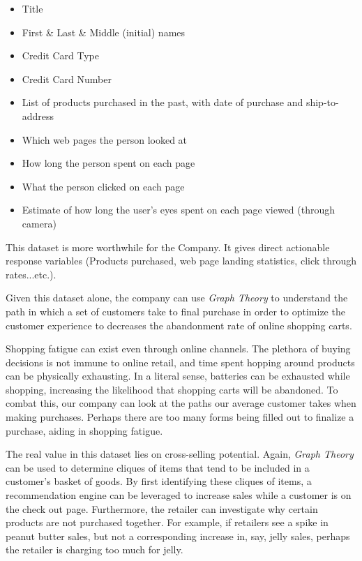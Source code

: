 \documentclass[letterpaper,12pt]{article}
\begin{document}
\begin{itemize}
\item Title
\item First \& Last \& Middle (initial) names
\item Credit Card Type
\item Credit Card Number
\item List of products purchased in the past, with date of purchase and ship-to-address
\item Which web pages the person looked at
\item How long the person spent on each page
\item What the person clicked on each page
\item Estimate of how long the user's eyes spent on each page viewed (through camera)
\end{itemize}

This dataset is more worthwhile for the Company.  It gives direct actionable response variables (Products purchased, web page landing statistics, click through rates...etc.).

Given this dataset alone, the company can use \emph{Graph Theory} to understand the path in which a set of customers take to final purchase in order to optimize the customer experience to decreases the abandonment rate of online shopping carts.

Shopping fatigue can exist even through online channels.  The plethora of buying decisions is not immune to online retail, and time spent hopping around products can be physically exhausting.  In a literal sense, batteries can be exhausted while shopping, increasing the likelihood that shopping carts will be abandoned.  To combat this, our company can look at the paths our average customer takes when making purchases.  Perhaps there are too many forms being filled out to finalize a purchase, aiding in shopping fatigue.

The real value in this dataset lies on cross-selling potential.  Again, \emph{Graph Theory} can be used to determine cliques of items that tend to be included in a customer's basket of goods.  By first identifying these cliques of items, a recommendation engine can be leveraged to increase sales while a customer is on the check out page.  Furthermore, the retailer can investigate why certain products are not purchased together.  For example, if retailers see a spike in peanut butter sales, but not a corresponding increase in, say, jelly sales, perhaps the retailer is charging too much for jelly.
\end{document}
